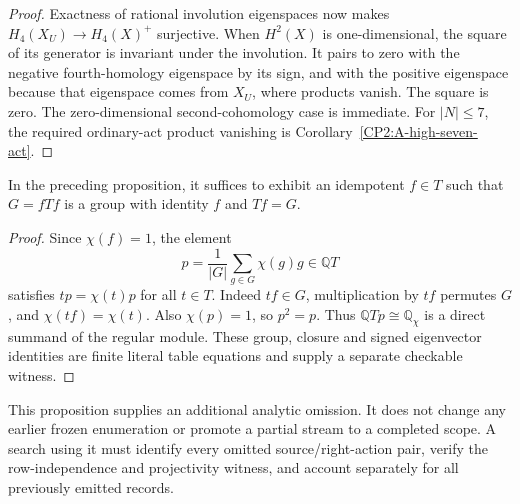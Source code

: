 \begin{proof}
Exactness of rational involution eigenspaces now makes
$H_4(X_U)\to H_4(X)^+$ surjective.  When $H^2(X)$ is
one-dimensional, the square of its generator is invariant
under the involution.  It pairs to zero with the negative
fourth-homology eigenspace by its sign, and with the
positive eigenspace because that eigenspace comes from
$X_U$, where products vanish.  The square is zero.
The zero-dimensional second-cohomology case is immediate.
For $|N|\le7$, the required ordinary-act product
vanishing is Corollary~\ref{CP2:A-high-seven-act}.
\end{proof}

\begin{lemma}
\label{CP2:A-permutation-source-projective-character}
In the preceding proposition, it suffices to exhibit an
idempotent $f\in T$ such that $G=fTf$ is a group with
identity $f$ and $Tf=G$.
\end{lemma}
\begin{proof}
Since $\chi(f)=1$, the element
\[
 p=\frac1{|G|}\sum_{g\in G}\chi(g)g\in\mathbb QT
\]
satisfies $tp=\chi(t)p$ for all $t\in T$.
Indeed $tf\in G$, multiplication by $tf$ permutes $G$,
and $\chi(tf)=\chi(t)$.  Also $\chi(p)=1$, so $p^2=p$.
Thus $\mathbb QT p\cong\mathbb Q_\chi$ is a direct
summand of the regular module.  These group, closure and
signed eigenvector identities are finite literal table
equations and supply a separate checkable witness.
\end{proof}

\begin{remark*}
This proposition supplies an additional analytic omission.
It does not change any earlier frozen enumeration or
promote a partial stream to a completed scope.  A search
using it must identify every omitted source/right-action
pair, verify the row-independence and projectivity witness,
and account separately for all previously emitted records.
\end{remark*}
